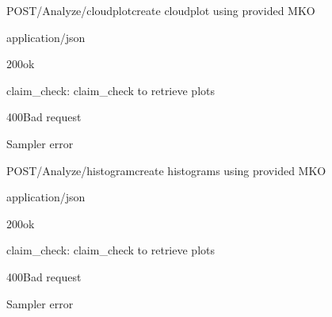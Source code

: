 \documentclass[12pt, etter]{article}
\begin{document}
\begin{apiRoute}{POST}{/Analyze/cloudplot}{create cloudplot using provided MKO}
    \begin{routeParameter}
    \end{routeParameter}
    \begin{routeResponse}{application/json}
        \begin{routeResponseItem}{200}{ok}
            \begin{routeResponseItemBody}
                claim_check: claim_check to retrieve plots
            \end{routeResponseItemBody}
        \end{routeResponseItem}
        \begin{routeResponseItem}{400}{Bad request}
            \begin{routeResponseItemBody}
                Sampler error
            \end{routeResponseItemBody}
        \end{routeResponseItem}
    \end{routeResponse}
\end{apiRoute}

\begin{apiRoute}{POST}{/Analyze/histogram}{create histograms using provided MKO}
    \begin{routeParameter}
    \end{routeParameter}
    \begin{routeResponse}{application/json}
        \begin{routeResponseItem}{200}{ok}
            \begin{routeResponseItemBody}
                claim_check: claim_check to retrieve plots
            \end{routeResponseItemBody}
        \end{routeResponseItem}
        \begin{routeResponseItem}{400}{Bad request}
            \begin{routeResponseItemBody}
                Sampler error
            \end{routeResponseItemBody}
        \end{routeResponseItem}
    \end{routeResponse}
\end{apiRoute}
\end{document}

